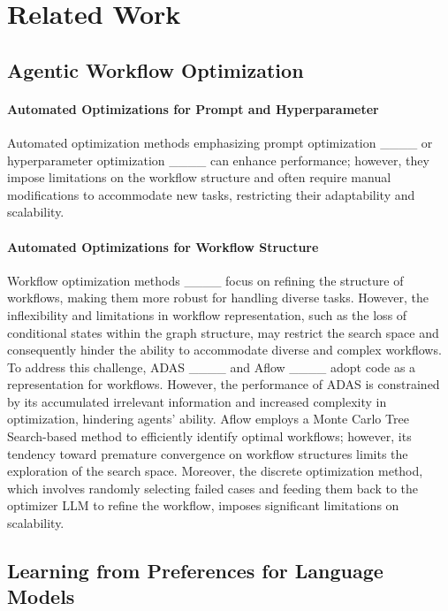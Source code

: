 \section{Related Work}
\subsection{Agentic Workflow Optimization}




\paragraph{Automated Optimizations for Prompt and Hyperparameter} 
 
Automated optimization methods emphasizing prompt optimization ____ or hyperparameter optimization ____ can enhance performance; however, they impose limitations on the workflow structure and often require manual modifications to accommodate new tasks, restricting their adaptability and scalability.

\paragraph{Automated Optimizations for Workflow Structure} Workflow optimization methods ____ focus on refining the structure of workflows, making them more robust for handling diverse tasks.
However, the inflexibility and limitations in workflow representation, such as the loss of conditional states within the graph structure, may restrict the search space and consequently hinder the ability to accommodate diverse and complex workflows.
To address this challenge, ADAS ____ and Aflow ____ adopt code as a representation for workflows.
However, the performance of ADAS is constrained by its accumulated irrelevant information and increased complexity in optimization, hindering agents' ability. Aflow employs a Monte Carlo Tree Search-based method to efficiently identify optimal workflows; however, its tendency toward premature convergence on workflow structures limits the exploration of the search space. Moreover, the discrete optimization method, which involves randomly selecting failed cases and feeding them back to the optimizer LLM to refine the workflow, imposes significant limitations on scalability.






\subsection{Learning from Preferences for Language Models}

